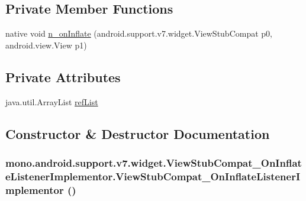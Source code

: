 \subsection*{Private Member Functions}
\begin{CompactItemize}
\item 
native void \hyperlink{classmono_1_1android_1_1support_1_1v7_1_1widget_1_1_view_stub_compat___on_inflate_listener_implementor_7442a59ff094fcb15584e3b32e2e6baf}{n\_\-onInflate} (android.support.v7.widget.ViewStubCompat p0, android.view.View p1)
\end{CompactItemize}
\subsection*{Private Attributes}
\begin{CompactItemize}
\item 
java.util.ArrayList \hyperlink{classmono_1_1android_1_1support_1_1v7_1_1widget_1_1_view_stub_compat___on_inflate_listener_implementor_479175b46094c8c3cb0df597892611fc}{refList}
\end{CompactItemize}


\subsection{Constructor \& Destructor Documentation}
\hypertarget{classmono_1_1android_1_1support_1_1v7_1_1widget_1_1_view_stub_compat___on_inflate_listener_implementor_e2f21c596eefebf17053928c18deed0c}{
\subsubsection[{ViewStubCompat\_\-OnInflateListenerImplementor}]{\setlength{\rightskip}{0pt plus 5cm}mono.android.support.v7.widget.ViewStubCompat\_\-OnInflateListenerImplementor.ViewStubCompat\_\-OnInflateListenerImplementor ()}}
\label{classmono_1_1android_1_1support_1_1v7_1_1widget_1_1_view_stub_compat___on_inflate_listener_implementor_e2f21c596eefebf17053928c18deed0c}




